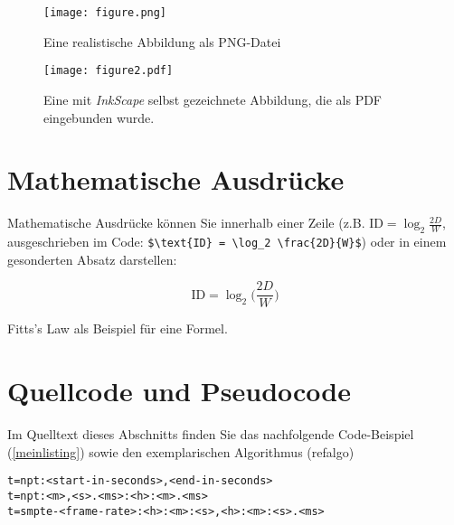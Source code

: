 \documentclass[twoside,bibliography=totoc,openany]{fumi}
\begin{document}
\begin{figure}[h!]

\texttt{[image: figure.png]}
\caption{\label{einbild}Eine realistische Abbildung als PNG-Datei}
\end{figure}

\begin{figure}[h!]
\texttt{[image: figure2.pdf]}
\caption{\label{nocheinbild}Eine mit \textit{InkScape} selbst gezeichnete Abbildung, die als PDF eingebunden wurde.}
\end{figure}
\clearpage

\section{Mathematische Ausdrücke}

Mathematische Ausdrücke können Sie innerhalb einer Zeile (z.B. $\text{ID} = \log_2 \frac{2D}{W}$, ausgeschrieben im Code: \verb|$\text{ID} = \log_2 \frac{2D}{W}$|) oder in einem gesonderten Absatz darstellen:
\begin{formel}[!ht]
   \begin{equation}
     \text{ID} = \log_2 \Bigg(\frac{2D} {W}\Bigg)
   \end{equation}
   \caption{Fitts's Law als Beispiel für eine Formel.}
\end{formel}



\section{Quellcode und Pseudocode}
Im Quelltext dieses Abschnitts finden Sie das nachfolgende Code-Beispiel (\ref{meinlisting}) sowie den exemplarischen Algorithmus (ref{algo})


\begin{lstlisting}[basicstyle=\small,
             inputencoding={utf8}, 
             extendedchars=false,
             commentstyle=\color{black}, 
             keywordstyle=\color{black}, 
             escapeinside=``,
             linewidth=.99\textwidth,
             caption={Eine kurze Codesequenz},
             label={listing:meinlisting}]
t=npt:<start-in-seconds>,<end-in-seconds>
t=npt:<m>,<s>.<ms>:<h>:<m>.<ms>
t=smpte-<frame-rate>:<h>:<m>:<s>,<h>:<m>:<s>.<ms>
\end{lstlisting}
\end{document}
